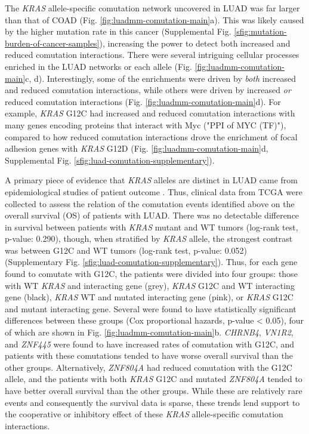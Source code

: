 \documentclass[english, 10pt, letterpaper]{article}
\newcommand{\KRAS}{\emph{KRAS}}
\begin{document}
The \KRAS{} allele-specific comutation network uncovered in LUAD was far larger than that of COAD (Fig. \ref{fig:luadmm-comutation-main}a).
This was likely caused by the higher mutation rate in this cancer (Supplemental Fig. \ref{sfig:mutation-burden-of-cancer-samples}), increasing the power to detect both increased and reduced comutation interactions.
There were several intriguing cellular processes enriched in the LUAD networks or each allele (Fig. \ref{fig:luadmm-comutation-main}c, d).
Interestingly, some of the enrichments were driven by \emph{both} increased and reduced comutation interactions, while others were driven by increased \emph{or} reduced comutation interactions (Fig. \ref{fig:luadmm-comutation-main}d).
For example, \KRAS{} G12C had increased and reduced comutation interactions with many genes encoding proteins that interact with Myc ("PPI of MYC (TF)"), compared to how reduced comutation interactions drove the enrichment of focal adhesion genes with \KRAS{} G12D (Fig. \ref{fig:luadmm-comutation-main}d, Supplemental Fig. \ref{sfig:luad-comutation-supplementary}).

A primary piece of evidence that \KRAS{} alleles are distinct in LUAD came from epidemiological studies of patient outcome \cite{Cserepes2014Subtype-specificChemotherapy., Marabese2015KRASChemotherapy.}.
Thus, clinical data from TCGA \cite{CancerGenomeAtlasResearchNetwork2014} were collected to assess the relation of the comutation events identified above on the overall survival (OS) of patients with LUAD.
There was no detectable difference in survival between patients with \KRAS{} mutant and WT tumors (log-rank test, p-value: 0.290), though, when stratified by \KRAS{} allele, the strongest contrast was between G12C and WT tumors (log-rank test, p-value: 0.052) (Supplementary Fig. \ref{sfig:luad-comutation-supplementary}).
Thus, for each gene found to comutate with G12C, the patients were divided into four groups: those with WT \KRAS{} and interacting gene (grey), \KRAS{} G12C and WT interacting gene (black), \KRAS{} WT and mutated interacting gene (pink), or \KRAS{} G12C and mutant interacting gene.
Several were found to have statistically significant differences between these groups (Cox proportional hazards, p-value < 0.05), four of which are shown in Fig. \ref{fig:luadmm-comutation-main}b.
\emph{CHRNB4}, \emph{VN1R2}, and \emph{ZNF445} were found to have increased rates of comutation with G12C, and patients with these comutations tended to have worse overall survival than the other groups.
Alternatively, \emph{ZNF804A} had reduced comutation with the G12C allele, and the patients with both \KRAS{} G12C and mutated \emph{ZNF804A} tended to have better overall survival than the other groups.
While these are relatively rare events and consequently the survival data is sparse, these trends lend support to the cooperative or inhibitory effect of these \KRAS{} allele-specific comutation interactions.
\end{document}
